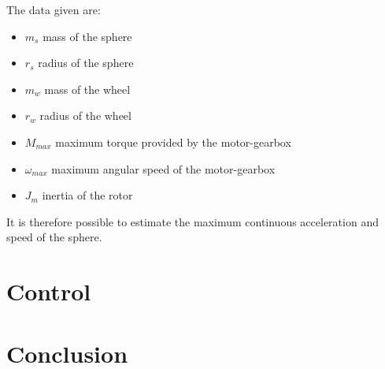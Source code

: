 \documentclass[12pt,a4paper]{article}
\begin{document}
The data given are:
\begin{itemize}
	\item $m_s$ mass of the sphere
	\item $r_s$ radius of the sphere
	\item $m_w$ mass of the wheel
	\item $r_w$ radius of the wheel
	\item $M_{max}$ maximum torque provided by the motor-gearbox 
	\item $\omega_{max}$ maximum angular speed of the motor-gearbox
	\item $J_m$ inertia of the rotor
\end{itemize}
It is therefore possible to estimate the maximum continuous  acceleration and speed of the sphere.

\section{Control} \label{sec:control}

\section{Conclusion} \label{sec:conc}
\end{document}
